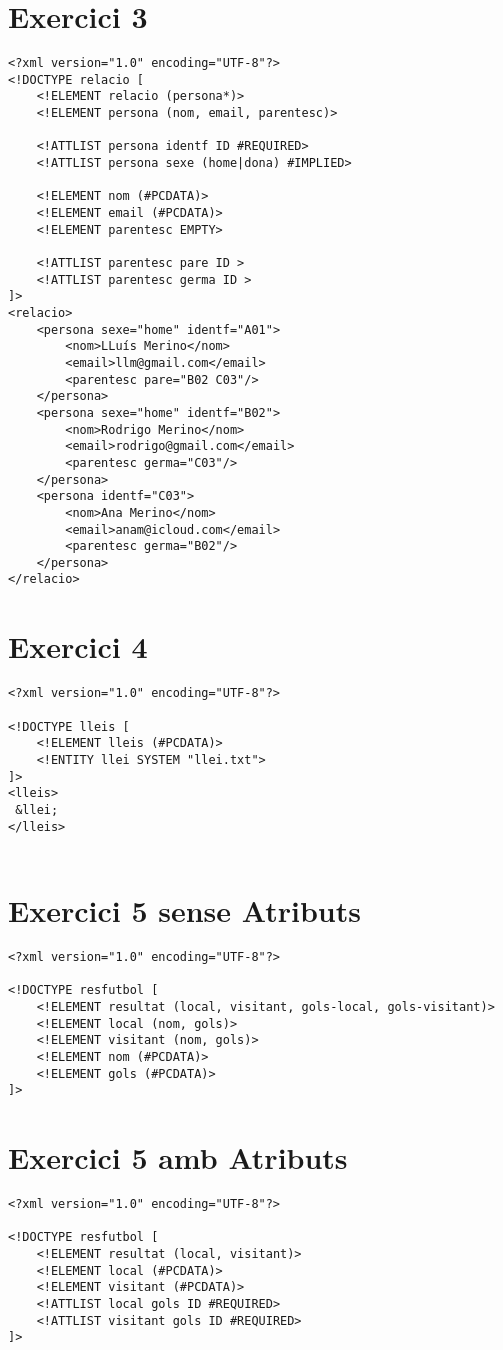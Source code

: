 \documentclass{article}
\begin{document}
\section{Exercici 3}

\begin{verbatim}
<?xml version="1.0" encoding="UTF-8"?>
<!DOCTYPE relacio [
    <!ELEMENT relacio (persona*)>
    <!ELEMENT persona (nom, email, parentesc)>

    <!ATTLIST persona identf ID #REQUIRED>
    <!ATTLIST persona sexe (home|dona) #IMPLIED>
  
    <!ELEMENT nom (#PCDATA)>
    <!ELEMENT email (#PCDATA)>
    <!ELEMENT parentesc EMPTY>
  
    <!ATTLIST parentesc pare ID >
    <!ATTLIST parentesc germa ID >
]>
<relacio>
    <persona sexe="home" identf="A01">
        <nom>LLuís Merino</nom>
        <email>llm@gmail.com</email>
        <parentesc pare="B02 C03"/>
    </persona>
    <persona sexe="home" identf="B02">
        <nom>Rodrigo Merino</nom>
        <email>rodrigo@gmail.com</email>
        <parentesc germa="C03"/>
    </persona>
    <persona identf="C03">
        <nom>Ana Merino</nom>
        <email>anam@icloud.com</email>
        <parentesc germa="B02"/>
    </persona>
</relacio> 
\end{verbatim}

\section{Exercici 4}

\begin{verbatim}
<?xml version="1.0" encoding="UTF-8"?>

<!DOCTYPE lleis [
    <!ELEMENT lleis (#PCDATA)>
    <!ENTITY llei SYSTEM "llei.txt">
]>
<lleis>
 &llei;
</lleis>


\end{verbatim}

\section{Exercici 5 sense Atributs}

\begin{verbatim}
<?xml version="1.0" encoding="UTF-8"?>

<!DOCTYPE resfutbol [
    <!ELEMENT resultat (local, visitant, gols-local, gols-visitant)>
    <!ELEMENT local (nom, gols)>
    <!ELEMENT visitant (nom, gols)>
    <!ELEMENT nom (#PCDATA)>
    <!ELEMENT gols (#PCDATA)>
]>
\end{verbatim} 

\section{Exercici 5 amb Atributs}

\begin{verbatim}
<?xml version="1.0" encoding="UTF-8"?>

<!DOCTYPE resfutbol [
    <!ELEMENT resultat (local, visitant)>
    <!ELEMENT local (#PCDATA)>
    <!ELEMENT visitant (#PCDATA)>
    <!ATTLIST local gols ID #REQUIRED>
    <!ATTLIST visitant gols ID #REQUIRED>
]>
\end{verbatim}
\end{document}
